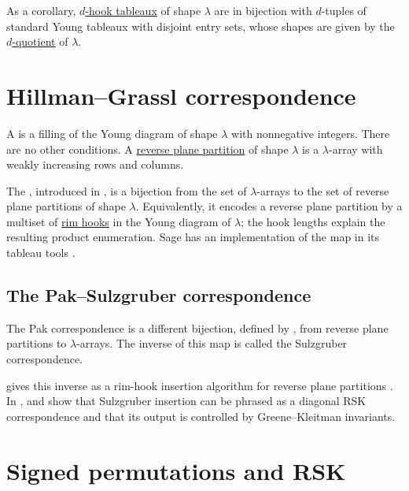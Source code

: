 As a corollary, \hyperref[borderStripTableauxDefinition]{$d$-hook tableaux} of
shape $\lambda$ are in bijection with
$d$-tuples of standard Young tableaux with disjoint entry sets, whose shapes
are given by the \hyperref[partitionQuotient]{$d$-quotient} of $\lambda$.


\section[hillmanGrassl]{Hillman--Grassl correspondence}

A \label{lambdaArray} is a filling of the Young
diagram of shape $\lambda$ with nonnegative integers.  There are no other
conditions.
A \hyperref[planePartitions]{reverse plane partition} of shape $\lambda$ is a
$\lambda$-array with weakly increasing rows and columns.

The \label{hillmanGrasslCorrespondence},
introduced in
\cite{HillmanGrassl1976}, is a bijection from the set of $\lambda$-arrays to
the set of reverse plane partitions of shape $\lambda$.  Equivalently, it
encodes a reverse plane partition by a multiset of
\hyperref[borderStripTableauxDefinition]{rim hooks} in the Young
diagram of $\lambda$; the hook lengths explain the resulting product
enumeration.  Sage has an implementation of the map in its tableau tools
\cite{Sage,Sage-Combinat}.


\subsection[sulzgruberInsertion]{The Pak--Sulzgruber correspondence}

The Pak correspondence is a different bijection, defined by 
\cite{Pak2001}, from reverse plane partitions to $\lambda$-arrays.  The
inverse of this map is called the Sulzgruber correspondence.

 gives this inverse as a rim-hook insertion algorithm
for reverse plane partitions \cite{Sulzgruber2020}.  In
\cite{GarverPatrias2019},  and 
show that Sulzgruber insertion can be phrased as a diagonal RSK
correspondence and that its output is controlled by Greene--Kleitman
invariants.




\section[signedPermutationsRSK]{Signed permutations and RSK}

